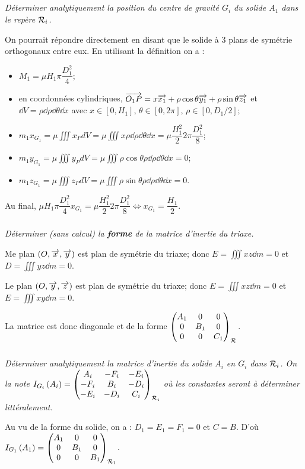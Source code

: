 \documentclass[10pt,fleqn]{article} %
\begin{document}
\begin{multicols}{2}
\subparagraph{}
\textit{Déterminer analytiquement la position du centre de gravité $G_i$ du solide $A_1$ dans le repère $\rep{i}$.}
\ifprof
\begin{corrige}
On pourrait répondre directement en disant que le solide à 3 plans de symétrie orthogonaux entre eux. 
En utilisant la définition on a :
\begin{itemize}
\item $M_1 =\mu H_1\pi \dfrac{D_1^2}{4}$;
\item en coordonnées cylindriques, $\vect{O_1P}=x\vect{x_1}+ \rho \cos\theta \vect{y_1}+\rho \sin\theta \vect{z_1}$ et $\dd V = \rho\dd \rho \dd \theta \dd x$ avec $x\in[0,H_1]$, $\theta\in [0,2\pi]$, $\rho \in \left[0,D_1/2\right]$;
\item $m_1x_{G_1}=\mu \iiint x_P dV = \mu \iiint x  \rho\dd \rho \dd \theta \dd x= \mu \dfrac{H_1^2}{2} 2\pi \dfrac{D_1^2}{8}$;
\item $m_1y_{G_1}=\mu \iiint y_P dV = \mu \iiint \rho \cos\theta   \rho\dd \rho \dd \theta \dd x=0$;
\item $m_1z_{G_1}=\mu \iiint z_P dV = \mu \iiint \rho \sin\theta  \rho\dd \rho \dd \theta \dd x=0$. 
\end{itemize}
Au final,  $\mu H_1\pi  \dfrac{D_1^2}{4}x_{G_1}=\mu \dfrac{H_1^2}{2}  2\pi  \dfrac{D_1^2}{8} \Leftrightarrow   x_{G_1}= \dfrac{H_1}{2}$.
\end{corrige}
\else
\fi


\subparagraph{}
\textit{Déterminer (sans calcul) la \textbf{forme} de la matrice d'inertie du triaxe.}
\ifprof
\begin{corrige}
Me plan $\left(O,\vect{x},\vect{y}\right)$ est plan de symétrie du triaxe; donc $E = \iiint xz \dd m = 0 $ et $D = \iiint yz \dd m = 0 $.

Le plan $\left(O,\vect{y},\vect{z}\right)$ est plan de symétrie du triaxe; donc $E = \iiint xz \dd m = 0 $ et $E = \iiint xy \dd m = 0 $.

La matrice est donc diagonale et de la forme $\matinertie{A_1}{B_1}{C_1}{0}{0}{0}{\rep{}}$.

\end{corrige}
\else
\fi

\subparagraph{}
\textit{Déterminer analytiquement la matrice d'inertie du solide $A_i$ en $G_
i$ dans $\rep{i}$. On la note $\inertie{G_i}{A_i}=\matinertie{A_i}{B_i}{C_i}{-D_i}{-E_i}{-F_i}{\rep{i}}$ où les constantes seront à déterminer littéralement.}
\ifprof
\begin{corrige}
Au vu de la forme du solide, on a : $D_1=E_1=F_1 = 0$ et $C=B$. D'où  $\inertie{G_1}{A_1}=\matinertie{A_1}{B_1}{B_1}{0}{0}{0}{\rep{1}}$.


\end{corrige}
\end{multicols}
\end{document}
